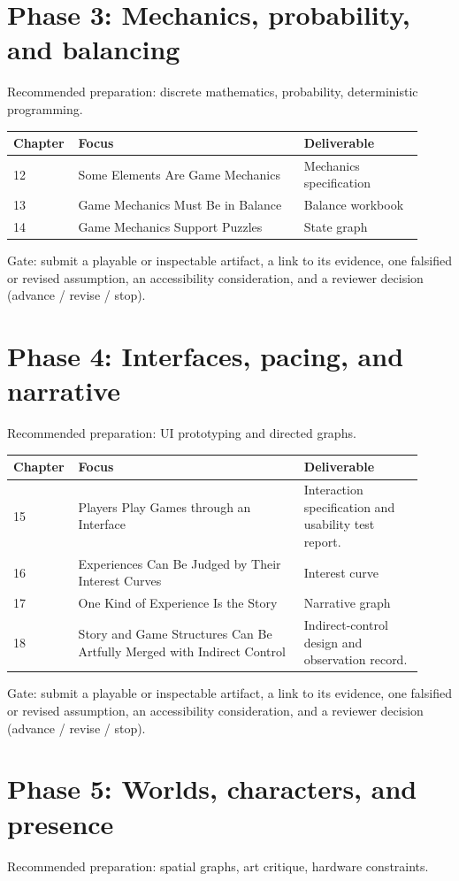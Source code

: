 \documentclass[11pt]{article}
\begin{document}
\section{Phase 3: Mechanics, probability, and balancing}
Recommended preparation: discrete mathematics, probability, deterministic programming.

\begin{longtable}{@{}p{0.11\linewidth}p{0.53\linewidth}p{0.28\linewidth}@{}}\toprule Chapter & Focus & Deliverable \\ \midrule\endhead
12 & Some Elements Are Game Mechanics & Mechanics specification \\
13 & Game Mechanics Must Be in Balance & Balance workbook \\
14 & Game Mechanics Support Puzzles & State graph \\
\bottomrule\end{longtable}
Gate: submit a playable or inspectable artifact, a link to its evidence, one falsified or revised assumption, an accessibility consideration, and a reviewer decision (advance / revise / stop).


\section{Phase 4: Interfaces, pacing, and narrative}
Recommended preparation: UI prototyping and directed graphs.

\begin{longtable}{@{}p{0.11\linewidth}p{0.53\linewidth}p{0.28\linewidth}@{}}\toprule Chapter & Focus & Deliverable \\ \midrule\endhead
15 & Players Play Games through an Interface & Interaction specification and usability test report. \\
16 & Experiences Can Be Judged by Their Interest Curves & Interest curve \\
17 & One Kind of Experience Is the Story & Narrative graph \\
18 & Story and Game Structures Can Be Artfully Merged with Indirect Control & Indirect-control design and observation record. \\
\bottomrule\end{longtable}
Gate: submit a playable or inspectable artifact, a link to its evidence, one falsified or revised assumption, an accessibility consideration, and a reviewer decision (advance / revise / stop).


\section{Phase 5: Worlds, characters, and presence}
Recommended preparation: spatial graphs, art critique, hardware constraints.
\end{document}

